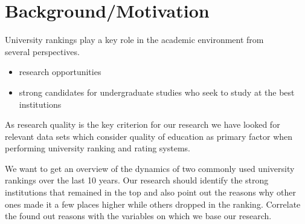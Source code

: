 \section{Background/Motivation}\label{sec:background}

University rankings play a key role in the academic environment from\\ several perspectives.
\begin{itemize}
	\item research opportunities
	\item strong candidates for undergraduate studies who seek to study at the
		best institutions
\end{itemize}
 As research quality is the key criterion for our research we have looked for
 relevant data sets which consider quality of education as primary factor when
 performing university ranking and rating systems.


We want to get an overview of the dynamics of two commonly used university rankings over the last 10 years.
Our research should identify the strong institutions that remained in the top and also point out the reasons why other ones made it a few places higher while others dropped in the ranking. Correlate the found out reasons with the variables on which we base our research.